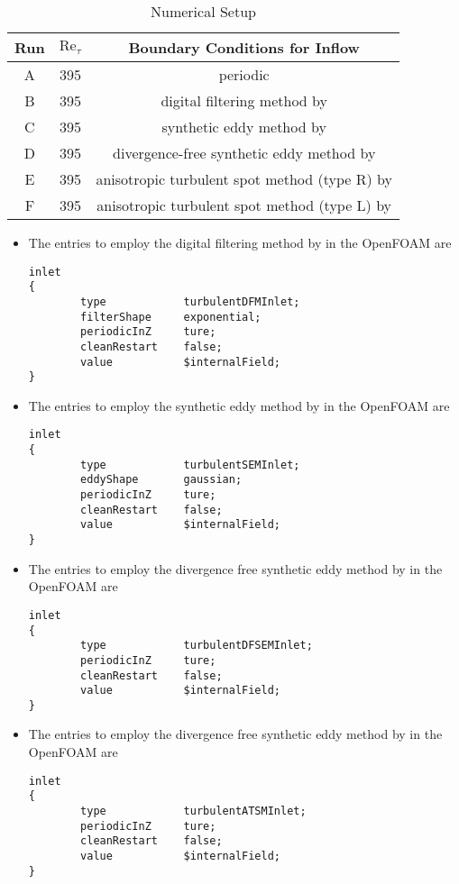 \begin{table}[H]
\centering
\begin{tabular}{c|c|c}
\hline
Run & $\mathrm{Re}_{\tau}$ & Boundary Conditions for Inflow \\
\hline
A & 395 & periodic \\
B & 395 & digital filtering method by \cite{xie2008} \\
C & 395 & synthetic eddy method by \cite{jarrin2006} \\
D & 395 & divergence-free synthetic eddy method by \cite{poletto2013} \\
E & 395 & anisotropic turbulent spot method (type R) by \cite{kroger2018} \\
F & 395 & anisotropic turbulent spot method (type L) by \cite{kroger2018} \\
\hline
\end{tabular} \caption{Numerical Setup}\label{testCases}
\end{table}

\begin{itemize}

\item The entries to employ the digital filtering method by \cite{xie2008} in the OpenFOAM are
\begin{lstlisting}
inlet
{
        type            turbulentDFMInlet;
        filterShape     exponential;
        periodicInZ     ture;
        cleanRestart    false;
        value           $internalField;
}
\end{lstlisting}


\item The entries to employ the synthetic eddy method by \cite{jarrin2006} in the OpenFOAM are
\begin{lstlisting}
inlet
{
        type            turbulentSEMInlet;
        eddyShape       gaussian;
        periodicInZ     ture;
        cleanRestart    false;
        value           $internalField;
}
\end{lstlisting}


\item The entries to employ the divergence free synthetic eddy method by \cite{poletto2013} in the OpenFOAM are
\begin{lstlisting}
inlet
{
        type            turbulentDFSEMInlet;
        periodicInZ     ture;
        cleanRestart    false;
        value           $internalField;
}
\end{lstlisting}


\item The entries to employ the divergence free synthetic eddy method by \cite{kroger2018} in the OpenFOAM are
\begin{lstlisting}
inlet
{
        type            turbulentATSMInlet;
        periodicInZ     ture;
        cleanRestart    false;
        value           $internalField;
}
\end{lstlisting}

\end{itemize}


